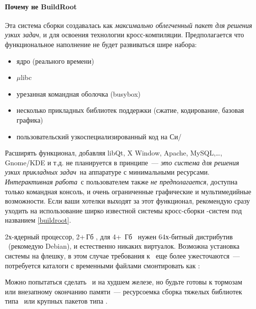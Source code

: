 \paragraph{Почему не BuildRoot}

Эта система сборки создавалась как \emph{максимально облегченный пакет
для решения узких задач}, и для освоения технологии кросс-компиляции.
Предполагается что функциональное наполнение не будет развиваться шире набора:

\begin{itemize}[nosep]
  \item ядро (реального времени)
  \item $\mu$libc
  \item урезанная командная оболочка (busybox)
  \item несколько прикладных библиотек поддержки (сжатие, кодирование, базовая
  графика)
  \item пользовательский узкоспециализированный код на Си/\cpp
\end{itemize}

Расширять функционал, добавляя libQt, X Window, Apache, MySQL,\ldots, Gnome/KDE
и т.д. не планируется в принципе\ --- \emph{это система для решения узких
прикладных задач}\ на аппаратуре с минимальными ресурсами. \emph{Интерактивная работа}\ с пользователем также
\emph{не предполагается}, доступна только командная консоль, и очень ограниченные графические и мультимедийные
возможности. Если ваши хотелки выходят за этот функционал, рекомендую сразу
уходить на использование ширко известной системы кросс-сборки \linux-систем под
названием \ref{buildroot}.


2х-ядерный процессор, 2+\,Гб \ram, для 4+\, Гб \ram\ нужен 64х-битный
дистрибутив \linux\ (рекомедую Debian), и естественно никаких виртуалок.
Возможна установка системы на флешку, в этом случае требования к \ram\ еще более
ужесточаются\ --- потребуется каталоги с временными файлами смонтировать как
:


Можно попытаться сделать \ и на худшем железе, но будьте
готовы к тормозам или внезапному окончанию памяти\ --- ресурсоемка сборка
тяжелых библиотек типа \ или крупных пакетов типа .

